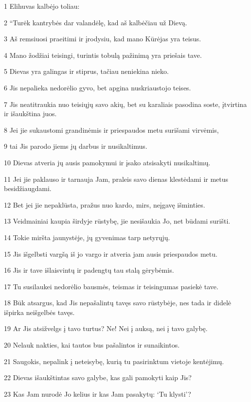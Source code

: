 \par 1 Elihuvas kalbėjo toliau: 
\par 2 “Turėk kantrybės dar valandėlę, kad aš kalbėčiau už Dievą. 
\par 3 Aš remsiuosi praeitimi ir įrodysiu, kad mano Kūrėjas yra teisus. 
\par 4 Mano žodžiai teisingi, turintis tobulą pažinimą yra priešais tave. 
\par 5 Dievas yra galingas ir stiprus, tačiau neniekina nieko. 
\par 6 Jis nepalieka nedorėlio gyvo, bet apgina nuskriaustojo teises. 
\par 7 Jis neatitraukia nuo teisiųjų savo akių, bet su karaliais pasodina soste, įtvirtina ir išaukština juos. 
\par 8 Jei jie sukaustomi grandinėmis ir priespaudos metu surišami virvėmis, 
\par 9 tai Jis parodo jiems jų darbus ir nusikaltimus. 
\par 10 Dievas atveria jų ausis pamokymui ir įsako atsisakyti nusikaltimų. 
\par 11 Jei jie paklauso ir tarnauja Jam, praleis savo dienas klestėdami ir metus besidžiaugdami. 
\par 12 Bet jei jie nepaklūsta, pražus nuo kardo, mirs, neįgavę išminties. 
\par 13 Veidmainiai kaupia širdyje rūstybę, jie nesišaukia Jo, net būdami surišti. 
\par 14 Tokie miršta jaunystėje, jų gyvenimas tarp netyrųjų. 
\par 15 Jis išgelbsti vargšą iš jo vargo ir atveria jam ausis priespaudos metu. 
\par 16 Jis ir tave išlaisvintų ir padengtų tau stalą gėrybėmis. 
\par 17 Tu susilaukei nedorėlio bausmės, teismas ir teisingumas pasiekė tave. 
\par 18 Būk atsargus, kad Jis nepašalintų tavęs savo rūstybėje, nes tada ir didelė išpirka neišgelbės tavęs. 
\par 19 Ar Jis atsižvelgs į tavo turtus? Ne! Nei į auksą, nei į tavo galybę. 
\par 20 Nelauk nakties, kai tautos bus pašalintos ir sunaikintos. 
\par 21 Saugokis, nepalink į neteisybę, kurią tu pasirinktum vietoje kentėjimų. 
\par 22 Dievas išaukštintas savo galybe, kas gali pamokyti kaip Jis? 
\par 23 Kas Jam nurodė Jo kelius ir kas Jam pasakytų: ‘Tu klysti’? 
